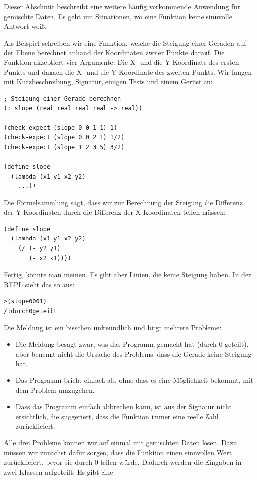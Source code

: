 %
Dieser Abschnitt beschreibt eine weitere häufig vorkommende Anwendung
für gemischte Daten.  Es geht um Situationen, wo eine Funktion
keine sinnvolle Antwort weiß.

Als Beispiel schreiben wir eine Funktion, welche die Steigung einer
Geraden auf der Ebene berechnet anhand der Koordinaten zweier Punkte
darauf.  Die Funktion akzeptiert vier Argumente: Die X- und die Y-Koordinate des
ersten Punkts und danach die X- und die Y-Koordinate des zweiten
Punkts.  Wir fangen mit Kurzbeschreibung, Signatur, einigen Tests
und einem Gerüst an:
%
\begin{lstlisting}
; Steigung einer Gerade berechnen
(: slope (real real real real -> real))

(check-expect (slope 0 0 1 1) 1)
(check-expect (slope 0 0 2 1) 1/2)
(check-expect (slope 1 2 3 5) 3/2)

(define slope
  (lambda (x1 y1 x2 y2)
    ...))
\end{lstlisting}
%
Die Formelsammlung sagt, dass wir zur Berechnung der Steigung die
Differenz der Y-Koordinaten durch die Differenz der X-Koordinaten
teilen müssen:
%
\begin{lstlisting}
(define slope
  (lambda (x1 y1 x2 y2)
    (/ (- y2 y1)
       (- x2 x1))))
\end{lstlisting}
%
Fertig, könnte man meinen.  Es gibt aber Linien, die keine Steigung
haben.  In der REPL sieht das so aus:
%
\begin{alltt}
> (slope 0 0 0 1)
{\color{red}/: durch 0 geteilt}
\end{alltt}
%
Die Meldung ist ein bisschen unfreundlich und birgt mehrere Probleme:
%
\begin{itemize}
\item Die Meldung besagt zwar, was das Programm gemacht hat (durch 0
  geteilt), aber benennt nicht die Ursache des Problems: dass die
  Gerade keine Steigung hat.
\item Das Programm bricht einfach ab, ohne dass es eine Möglichkeit
  bekommt, mit dem Problem umzugehen.
\item Dass das Programm einfach abbrechen kann, ist aus der Signatur
  nicht ersichtlich, die suggeriert, dass die Funktion immer eine
  reelle Zahl zurückliefert.
\end{itemize}
%
Alle drei Probleme können wir auf einmal mit gemischten Daten lösen.
Dazu müssen wir zunächst dafür sorgen, dass die Funktion einen
sinnvollen Wert zurückliefert, bevor sie durch 0 teilen würde.
Dadurch werden die Eingaben in zwei Klassen aufgeteilt: Es gibt eine
